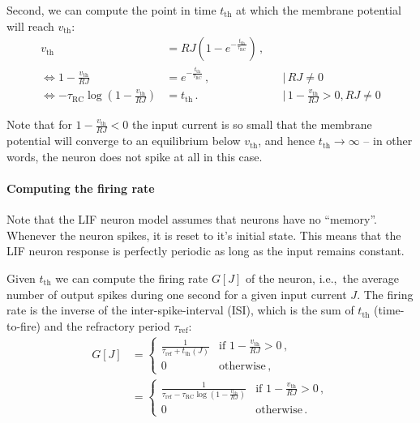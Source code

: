 \documentclass[10pt,letterpaper,oneside]{article}
\begin{document}
Second, we can compute the point in time $t_\mathrm{th}$ at which the membrane potential will reach $v_\mathrm{th}$:
\begin{align*}
	v_\mathrm{th} &= RJ \left(1 - e^{-\frac{t_\mathrm{th}}{\tau_\mathrm{RC}}} \right) \,, \\
	\Leftrightarrow 1 - \frac{v_\mathrm{th}}{RJ} &= e^{-\frac{t_\mathrm{th}}{\tau_\mathrm{RC}}} \,, && \Big| \, RJ \neq 0 \\
	\Leftrightarrow - \tau_\mathrm{RC} \log \left( 1 - \frac{v_\mathrm{th}}{RJ} \right) &= t_\mathrm{th} \,.  && \Big| \, 1 - \frac{v_\mathrm{th}}{RJ} > 0 , RJ \neq 0
\end{align*}


Note that for $1 - \frac{v_\mathrm{th}}{RJ} < 0$ the input current is so small that the membrane potential will converge to an equilibrium below $v_\mathrm{th}$, and hence $t_\mathrm{th} \to \infty$ -- in other words, the neuron does not spike at all in this case.

\paragraph{Computing the firing rate}

Note that the LIF neuron model assumes that neurons have no \enquote{memory}. Whenever the neuron spikes, it is reset to it's initial state. This means that the LIF neuron response is perfectly periodic as long as the input remains constant.


Given $t_\mathrm{th}$ we can compute the firing rate $G[J]$ of the neuron, i.e.,~the average number of output spikes during one second for a given input current $J$. The firing rate is the inverse of the inter-spike-interval (ISI), which is the sum of $t_\mathrm{th}$ (time-to-fire) and the refractory period $\tau_\mathrm{ref}$:
\begin{align*}
	G[J]
		&= \begin{cases}
			\frac{1}{\tau_\mathrm{ref} + t_\mathrm{th}(J)} & \text{if } 1 - \frac{v_\mathrm{th}}{RJ} > 0 \,,\\
			0 & \mathrm{otherwise} \,,
		\end{cases} \\
		&= \begin{cases}
			\frac{1}{\tau_\mathrm{ref} - \tau_\mathrm{RC} \log \left( 1 - \frac{v_\mathrm{th}}{RJ} \right)} & \text{if } 1 - \frac{v_\mathrm{th}}{RJ} > 0 \,,\\
			0 & \mathrm{otherwise} \,.
		\end{cases}
\end{align*}
\end{document}
